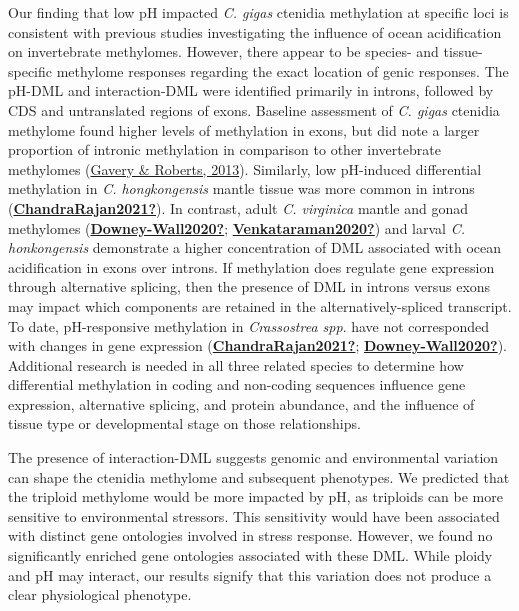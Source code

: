 \documentclass [11pt, proquest] {uwthesis}[2015/03/03]
\begin{document}
Our finding that low pH impacted \emph{C. gigas} ctenidia methylation at specific loci is consistent with previous studies investigating the influence of ocean acidification on invertebrate methylomes. However, there appear to be species- and tissue-specific methylome responses regarding the exact location of genic responses. The pH-DML and interaction-DML were identified primarily in introns, followed by CDS and untranslated regions of exons. Baseline assessment of \emph{C. gigas} ctenidia methylome found higher levels of methylation in exons, but did note a larger proportion of intronic methylation in comparison to other invertebrate methylomes (\protect\hyperlink{ref-Gavery2013}{Gavery \& Roberts, 2013}). Similarly, low pH-induced differential methylation in \emph{C. hongkongensis} mantle tissue was more common in introns (\protect\hyperlink{ref-ChandraRajan2021}{\textbf{ChandraRajan2021?}}). In contrast, adult \emph{C. virginica} mantle and gonad methylomes (\protect\hyperlink{ref-Downey-Wall2020}{\textbf{Downey-Wall2020?}}; \protect\hyperlink{ref-Venkataraman2020}{\textbf{Venkataraman2020?}}) and larval \emph{C. honkongensis} demonstrate a higher concentration of DML associated with ocean acidification in exons over introns. If methylation does regulate gene expression through alternative splicing, then the presence of DML in introns versus exons may impact which components are retained in the alternatively-spliced transcript. To date, pH-responsive methylation in \emph{Crassostrea spp}. have not corresponded with changes in gene expression (\protect\hyperlink{ref-ChandraRajan2021}{\textbf{ChandraRajan2021?}}; \protect\hyperlink{ref-Downey-Wall2020}{\textbf{Downey-Wall2020?}}). Additional research is needed in all three related species to determine how differential methylation in coding and non-coding sequences influence gene expression, alternative splicing, and protein abundance, and the influence of tissue type or developmental stage on those relationships.

The presence of interaction-DML suggests genomic and environmental variation can shape the ctenidia methylome and subsequent phenotypes. We predicted that the triploid methylome would be more impacted by pH, as triploids can be more sensitive to environmental stressors. This sensitivity would have been associated with distinct gene ontologies involved in stress response. However, we found no significantly enriched gene ontologies associated with these DML. While ploidy and pH may interact, our results signify that this variation does not produce a clear physiological phenotype.
\end{document}
